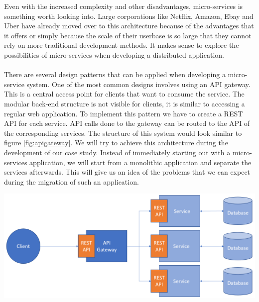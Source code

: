 \documentclass[12pt]{article}
\newenvironment{Figure}
	{\par\medskip\noindent\minipage{\linewidth}}
	{\endminipage\par\medskip}
\begin{document}
\begin{multicols}{2}
Even with the increased complexity and other disadvantages, micro-services is something worth looking into. Large corporations like Netflix, Amazon, Ebay and Uber have already moved over to this architecture because of the advantages that it offers or simply because the scale of their userbase is so large that they cannot rely on more traditional development methods. It makes sense to explore the possibilities of micro-services when developing a distributed application.
\\\\
There are several design patterns that can be applied when developing a micro-service system. \cite{MicroservicePatterns25:online} One of the most common designs involves using an API gateway. This is a central access point for clients that want to consume the service. The modular back-end structure is not visible for clients, it is similar to accessing a regular web application. To implement this pattern we have to create a REST API for each service. API calls done to the gateway can be routed to the API of the corresponding services. The structure of this system would look similar to figure \ref{fig:apigateway}. We will try to achieve this architecture during the development of our case study. Instead of immediately starting out with a micro-services application, we will start from a monolithic application and separate the services afterwards. This will give us an idea of the problems that we can expect during the migration of such an application. 

\begin{Figure}
	\centering
	\includegraphics[width=\linewidth]{illustrations/ApiGateway.png}
	\label{fig:apigateway}
\end{Figure}

\end{multicols}
\end{document}
